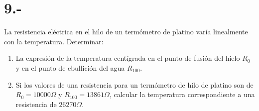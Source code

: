 \documentclass{article}
\begin{document}
\section*{9.-} 
La resistencia eléctrica en el hilo de un termómetro de platino varía linealmente con
la temperatura. Determinar:
\begin{enumerate}
    \item La expresión de la temperatura centígrada en el punto de fusión del hielo 
    $R_0$ y en el punto de ebullición del agua $R_{100}$. 
    
    \item Si los valores de una resistencia para un termómetro de hilo de platino son de 
    $R_0 = 10000 \Omega$ y $R_{100} = 13861 \Omega$, calcular la temperatura correspondiente 
    a una resistencia de $26270 \Omega$. 
\end{enumerate}
\end{document}
